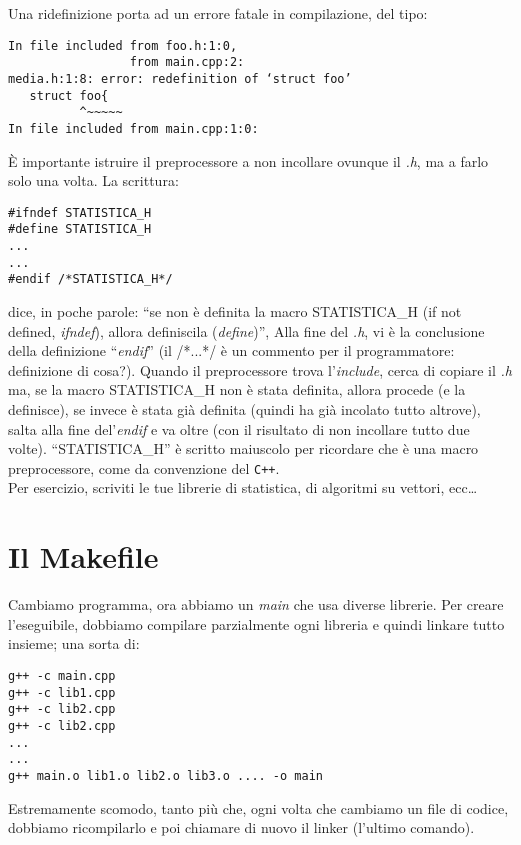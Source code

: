 Una ridefinizione porta ad un errore fatale in compilazione, del tipo:
\begin{shaded}
\begin{verbatim}
In file included from foo.h:1:0,
                 from main.cpp:2:
media.h:1:8: error: redefinition of ‘struct foo’
   struct foo{
          ^~~~~~
In file included from main.cpp:1:0:

\end{verbatim}
\end{shaded}
È importante istruire il preprocessore a non incollare ovunque il \emph{.h}, ma a farlo solo una volta. La scrittura:
\begin{lstlisting}
#ifndef STATISTICA_H
#define STATISTICA_H
...
...
#endif /*STATISTICA_H*/
\end{lstlisting}
dice, in poche parole: ``se non è definita la macro STATISTICA\_H (if not defined, \emph{ifndef}), allora definiscila (\emph{define})'', Alla fine del \emph{.h}, vi è la conclusione della definizione ``\emph{endif}'' (il /*...*/ è un commento per il programmatore: definizione di cosa?). Quando il preprocessore trova l'\emph{include}, cerca di copiare il \emph{.h} ma, se la macro STATISTICA\_H non è stata definita, allora procede (e la definisce), se invece è  stata già definita (quindi ha già incolato tutto altrove), salta alla fine del'\emph{endif} e va oltre (con il risultato di  non incollare tutto due volte). ``STATISTICA\_H'' è scritto maiuscolo per ricordare che è una macro preprocessore, come da convenzione del \verb|C++|.\\

Per esercizio, scriviti le tue librerie di statistica, di algoritmi su vettori, ecc\ldots

\section{Il Makefile}
Cambiamo programma, ora abbiamo un \emph{main} che usa diverse librerie. Per creare l'eseguibile, dobbiamo compilare parzialmente ogni libreria e quindi linkare tutto insieme; una sorta di:
\begin{shaded}
\begin{verbatim}
g++ -c main.cpp
g++ -c lib1.cpp
g++ -c lib2.cpp
g++ -c lib2.cpp
...
...
g++ main.o lib1.o lib2.o lib3.o .... -o main
\end{verbatim}
\end{shaded}
Estremamente scomodo, tanto più che, ogni volta che cambiamo un file di codice, dobbiamo ricompilarlo e poi chiamare di nuovo il linker (l'ultimo comando).

